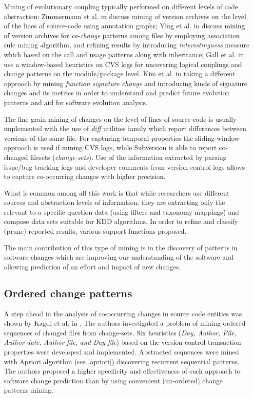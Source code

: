 Mining of evolutionary coupling typically performed on different levels of code abstraction: Zimmermann et al. in \cite{citeulike:4406375} discuss mining of version archives on the level of the lines of source-code using annotation graphs; Ying et al. in \cite{citeulike:983796} discuss mining of version archives for \textit{co-change} patterns among files by employing association rule mining algorithm, and refining results by introducing \textit{interestingness} measure which based on the call and usage patterns along with inheritance; Gall et al. in \cite{citeulike:5397994} use a window-based heuristics on CVS logs for uncovering logical couplings and change patterns on the module/package level. Kim et al. in \cite{citeulike:5375867} taking a different approach by mining \textit{function signature change} and introducing kinds of signature changes and its metrics in order to understand and predict future evolution patterns and aid for software evolution analysis.

The fine-grain mining of changes on the level of lines of source code is usually implemented with the use of \textit{diff} utilities family which report differences between versions of the same file. For capturing temporal properties the sliding-window approach is used if mining CVS logs, while Subversion is able to report co-changed filesets (\textit{change-sets}). Use of the information extracted by parsing issue/bug tracking logs and developer comments from version control logs allows to capture co-occurring changes with higher precision.

What is common among all this work is that while researchers use different sources and abstraction levels of information, they are extracting only the relevant to a specific question data (using filters and taxonomy mappings) and compose data sets suitable for KDD algorithms. In order to refine and classify (prune) reported results, various support functions proposed.

The main contribution of this type of mining is in the discovery of patterns in software changes which are improving our  understanding of the software and allowing prediction of an effort and impact of new changes.

\subsection{Ordered change patterns}
A step ahead in the analysis of co-occurring changes in source code entities was shown by Kagdi et al. in \cite{citeulike:3929070}. The authors investigated a problem of mining ordered sequences of changed files from change-sets. Six heuristics (\textit{Day, Author, File, Author-date, Author-file, and Day-file}) based on the version control transaction properties were developed and implemented. Abstracted sequences were mined with Apriori algorithm (see \ref{apriori}) discovering recurrent sequential patterns. The authors proposed a higher specificity and effectiveness of such approach to software change prediction than by using convenient (un-ordered) change patterns mining.

